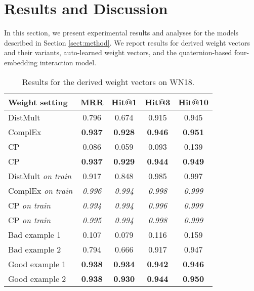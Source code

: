 \documentclass[sigconf,edbt]{acmart-edbt2019}
\begin{document}
\section{Results and Discussion} \label{sect:result}
In this section, we present experimental results and analyses for the models described in Section \ref{sect:method}. We report results for derived weight vectors and their variants, auto-learned weight vectors, and the quaternion-based four-embedding interaction model.

\begin{table*}[ht]
\centering
	
	\caption{Results for the derived weight vectors on WN18.}
	\label{tab:result}
	
	\begin{tabular}{l|c|c|c|c}
		\hline 
		\textbf{Weight setting} & \textbf{MRR} & \textbf{Hit@1} & \textbf{Hit@3} & \textbf{Hit@10}\\ 
		\hline
		
		DistMult  & 0.796 & 0.674 & 0.915 & 0.945\\ 
		ComplEx  & \textbf{0.937} & \textbf{0.928} & \textbf{0.946} & \textbf{0.951}\\ 
		CP  & 0.086 & 0.059 & 0.093 & 0.139\\ 
		CP  & \textbf{0.937} & \textbf{0.929} & \textbf{0.944} & \textbf{0.949}\\ 
		\hline
		
		DistMult \textit{on train} & 0.917 & 0.848 & 0.985 & 0.997\\ 
		ComplEx \textit{on train} & \textit{0.996} & \textit{0.994} & \textit{0.998} & \textit{0.999}\\ 
		CP \textit{on train} & \textit{0.994} & \textit{0.994} & \textit{0.996} & \textit{0.999}\\ 
		CP \textit{on train} & \textit{0.995} & \textit{0.994} & \textit{0.998} & \textit{0.999}\\ 
		\hline
		
		Bad example 1  & 0.107 & 0.079 & 0.116 & 0.159\\ 
		Bad example 2  & 0.794 & 0.666 & 0.917 & 0.947\\ 
		
		Good example 1  & \textbf{0.938} & \textbf{0.934} & \textbf{0.942} & \textbf{0.946}\\
		Good example 2  & \textbf{0.938} & \textbf{0.930} & \textbf{0.944} & \textbf{0.950}\\ 
		\hline 
	\end{tabular}
\end{table*}
\end{document}
